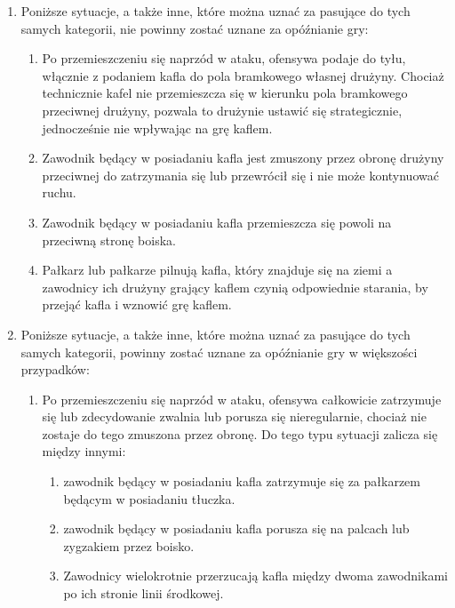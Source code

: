 \documentclass[12pt]{article}
\begin{document}
\begin{enumerate}
	\item Poniższe sytuacje, a także inne, które można uznać za pasujące do
	      tych samych kategorii, nie powinny zostać uznane za opóźnianie gry:

	      \begin{enumerate}
		      \item  Po przemieszczeniu się naprzód w ataku, ofensywa podaje do tyłu,
		            włącznie z podaniem kafla do pola bramkowego własnej drużyny. Chociaż
		            technicznie kafel nie przemieszcza się w kierunku pola bramkowego
		            przeciwnej drużyny, pozwala to drużynie ustawić się strategicznie,
		            jednocześnie nie wpływając na grę kaflem.

		      \item Zawodnik będący w posiadaniu kafla jest zmuszony przez obronę
		            drużyny przeciwnej do zatrzymania się lub przewrócił się i nie może
		            kontynuować ruchu.

		      \item Zawodnik będący w posiadaniu kafla przemieszcza się powoli na
		            przeciwną stronę boiska.

		      \item Pałkarz lub pałkarze pilnują kafla, który znajduje się na ziemi a
		            zawodnicy ich drużyny grający kaflem czynią odpowiednie starania, by
		            przejąć kafla i wznowić grę kaflem.
	      \end{enumerate}
	\item Poniższe sytuacje, a także inne, które można uznać za pasujące do
	      tych samych kategorii, powinny zostać uznane za opóźnianie gry w
	      większości przypadków:
	      \begin{enumerate}
		      \item Po przemieszczeniu się naprzód w ataku, ofensywa całkowicie
		            zatrzymuje się lub zdecydowanie zwalnia lub porusza się nieregularnie,
		            chociaż nie zostaje do tego zmuszona przez obronę. Do tego typu sytuacji
		            zalicza się między innymi:

		            \begin{enumerate}
			            \item
			                  zawodnik będący w posiadaniu kafla zatrzymuje się za pałkarzem będącym
			                  w posiadaniu tłuczka.
			            \item
			                  zawodnik będący w posiadaniu kafla porusza się na palcach lub
			                  zygzakiem przez boisko.
			            \item
			                  Zawodnicy wielokrotnie przerzucają kafla między dwoma zawodnikami po
			                  ich stronie linii środkowej.
		            \end{enumerate}


\end{enumerate}
\end{enumerate}
\end{document}
